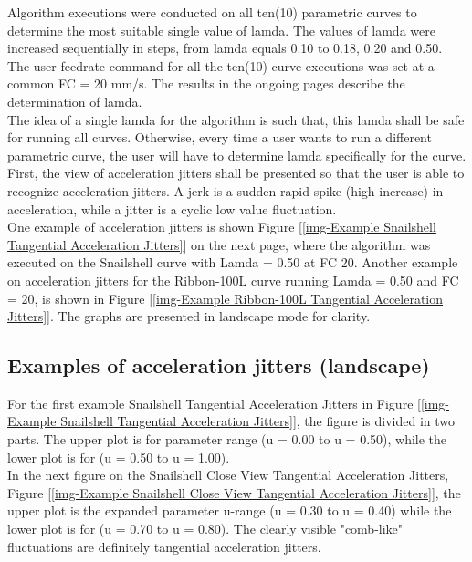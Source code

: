 Algorithm executions were conducted on all ten(10) parametric curves to determine the most suitable single value of lamda. The values of lamda were increased sequentially in steps, from lamda equals 0.10 to 0.18, 0.20 and 0.50. \\

The user feedrate command for all the ten(10) curve executions was set at a common FC = 20 mm/s. The results in the ongoing pages describe the determination of lamda. \\

The idea of a single lamda for the algorithm is such that, this lamda shall be safe for running all curves. Otherwise, every time a user wants to run a different parametric curve, the user will have to determine lamda specifically for the curve. \\

First, the view of acceleration jitters shall be presented so that the user is able to recognize acceleration jitters. A jerk is a sudden rapid spike (high increase) in acceleration, while a jitter is a cyclic low value fluctuation. \\

One example of acceleration jitters is shown Figure [\ref{img-Example Snailshell Tangential Acceleration Jitters}] on the next page, where the algorithm was executed on the Snailshell curve with Lamda = 0.50 at FC 20. Another example on acceleration jitters for the Ribbon-100L curve running Lamda = 0.50 and FC = 20,  is shown in Figure [\ref{img-Example Ribbon-100L Tangential Acceleration Jitters}]. The graphs are presented in landscape mode for clarity.\\


\clearpage
\pagebreak

\subsection{Examples of acceleration jitters (landscape)}

For the first example Snailshell Tangential Acceleration Jitters in Figure [\ref{img-Example Snailshell Tangential Acceleration Jitters}], the figure is divided in two parts. The upper plot is for parameter range (u = 0.00 to u = 0.50), while the lower plot is for (u = 0.50 to u = 1.00). \\ 

In the next figure on the Snailshell Close View Tangential Acceleration Jitters, Figure [\ref{img-Example Snailshell Close View Tangential Acceleration Jitters}], the upper plot is the expanded parameter u-range (u = 0.30 to u = 0.40) while the lower plot is for (u = 0.70 to u = 0.80). The clearly visible "comb-like" fluctuations are definitely tangential acceleration jitters.\\

